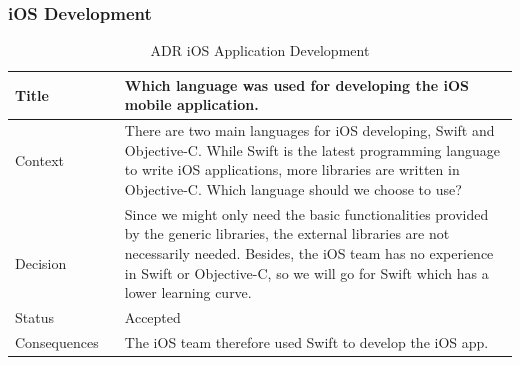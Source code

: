 \documentclass[12pt,a4paper]{article}
\begin{document}
\begin{appendices}
          \subsubsection{iOS Development}
            \begin{table}[H]
              \centering
                \begin{tabularx}{\textwidth}{l X}
                  \hline
                  Title & Which language was used for developing the iOS mobile application. \\ \hline
                  Context & There are two main languages for iOS developing, Swift and Objective-C. While Swift is the latest programming language to write iOS applications, more libraries are written in Objective-C. Which language should we choose to use?\\ 
                  Decision & Since we might only need the basic functionalities provided by the generic libraries, the external libraries are not necessarily needed. Besides, the iOS team has no experience in Swift or Objective-C, so we will go for Swift which has a lower learning curve. \\ 
                  Status & Accepted \\ 
                  Consequences & The iOS team therefore used Swift to develop the iOS app.  \\     
                  \hline
                \end{tabularx}
                \caption[Table caption text]{ADR iOS Application Development}
                \label{table:ADR iOS Application Development}
            \end{table}


\end{appendices}
\end{document}
